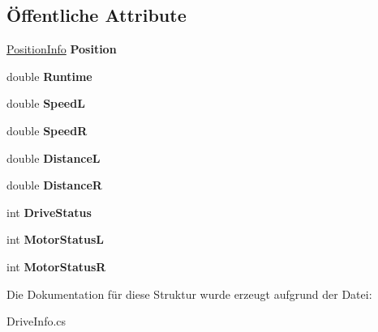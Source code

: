 \subsection*{Öffentliche Attribute}
\begin{DoxyCompactItemize}
\item 
\hypertarget{struct_robot_ctrl_1_1_drive_info_a551f6e86bc5fe62f98dc3a629dc6ed2e}{
\hyperlink{struct_robot_ctrl_1_1_position_info}{PositionInfo} {\bfseries Position}}
\label{struct_robot_ctrl_1_1_drive_info_a551f6e86bc5fe62f98dc3a629dc6ed2e}

\item 
\hypertarget{struct_robot_ctrl_1_1_drive_info_ab7c6391680557d3feaea4432f6d0badf}{
double {\bfseries Runtime}}
\label{struct_robot_ctrl_1_1_drive_info_ab7c6391680557d3feaea4432f6d0badf}

\item 
\hypertarget{struct_robot_ctrl_1_1_drive_info_ab227d6a5642692d88d32adbdb600d97c}{
double {\bfseries SpeedL}}
\label{struct_robot_ctrl_1_1_drive_info_ab227d6a5642692d88d32adbdb600d97c}

\item 
\hypertarget{struct_robot_ctrl_1_1_drive_info_aaeb49b7c4edd218d4df3586aea7f0317}{
double {\bfseries SpeedR}}
\label{struct_robot_ctrl_1_1_drive_info_aaeb49b7c4edd218d4df3586aea7f0317}

\item 
\hypertarget{struct_robot_ctrl_1_1_drive_info_a8927da9def3aa0d9ea8bc1994797bb48}{
double {\bfseries DistanceL}}
\label{struct_robot_ctrl_1_1_drive_info_a8927da9def3aa0d9ea8bc1994797bb48}

\item 
\hypertarget{struct_robot_ctrl_1_1_drive_info_ab83811fd141344442369db7aae6698c7}{
double {\bfseries DistanceR}}
\label{struct_robot_ctrl_1_1_drive_info_ab83811fd141344442369db7aae6698c7}

\item 
\hypertarget{struct_robot_ctrl_1_1_drive_info_af9b93e57cd3ffc06474d39d42a823a6d}{
int {\bfseries DriveStatus}}
\label{struct_robot_ctrl_1_1_drive_info_af9b93e57cd3ffc06474d39d42a823a6d}

\item 
\hypertarget{struct_robot_ctrl_1_1_drive_info_ab13d6cee7fac024d26854348884cfe88}{
int {\bfseries MotorStatusL}}
\label{struct_robot_ctrl_1_1_drive_info_ab13d6cee7fac024d26854348884cfe88}

\item 
\hypertarget{struct_robot_ctrl_1_1_drive_info_aa1c028c3cb8540db78c7ebc30fdb049a}{
int {\bfseries MotorStatusR}}
\label{struct_robot_ctrl_1_1_drive_info_aa1c028c3cb8540db78c7ebc30fdb049a}

\end{DoxyCompactItemize}


Die Dokumentation für diese Struktur wurde erzeugt aufgrund der Datei:\begin{DoxyCompactItemize}
\item 
DriveInfo.cs\end{DoxyCompactItemize}
